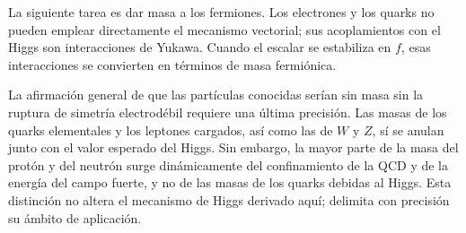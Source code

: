 La siguiente tarea es dar masa a los fermiones. Los electrones y los quarks no pueden emplear directamente el mecanismo vectorial; sus acoplamientos con el Higgs son interacciones de Yukawa. Cuando el escalar se estabiliza en \(f\), esas interacciones se convierten en términos de masa fermiónica.

La afirmación general de que las partículas conocidas serían sin masa sin la ruptura de simetría electrodébil requiere una última precisión. Las masas de los quarks elementales y los leptones cargados, así como las de \(W\) y \(Z\), sí se anulan junto con el valor esperado del Higgs. Sin embargo, la mayor parte de la masa del protón y del neutrón surge dinámicamente del confinamiento de la QCD y de la energía del campo fuerte, y no de las masas de los quarks debidas al Higgs. Esta distinción no altera el mecanismo de Higgs derivado aquí; delimita con precisión su ámbito de aplicación.
